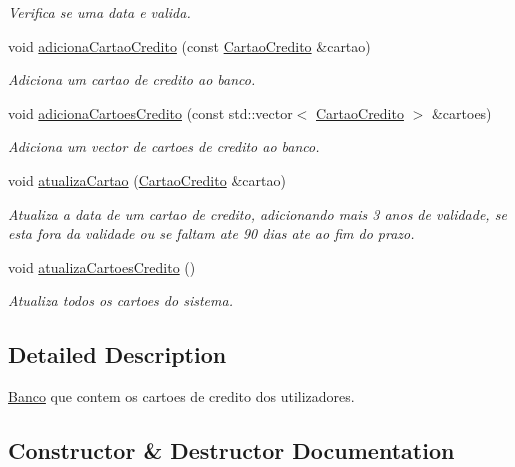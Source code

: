 \begin{DoxyCompactItemize}
\begin{DoxyCompactList}\small\item\em Verifica se uma data e valida. \end{DoxyCompactList}\item 
void \hyperlink{classBanco_a2ac1bb3c6a742743bcbb6dd0a312d74d}{adiciona\+Cartao\+Credito} (const \hyperlink{classCartaoCredito}{Cartao\+Credito} \&cartao)
\begin{DoxyCompactList}\small\item\em Adiciona um cartao de credito ao banco. \end{DoxyCompactList}\item 
void \hyperlink{classBanco_a5f36ab07909fc570d158a21e2e6398f5}{adiciona\+Cartoes\+Credito} (const std\+::vector$<$ \hyperlink{classCartaoCredito}{Cartao\+Credito} $>$ \&cartoes)
\begin{DoxyCompactList}\small\item\em Adiciona um vector de cartoes de credito ao banco. \end{DoxyCompactList}\item 
void \hyperlink{classBanco_a8c8f743903ba86129b62afbb3813e6f0}{atualiza\+Cartao} (\hyperlink{classCartaoCredito}{Cartao\+Credito} \&cartao)
\begin{DoxyCompactList}\small\item\em Atualiza a data de um cartao de credito, adicionando mais 3 anos de validade, se esta fora da validade ou se faltam ate 90 dias ate ao fim do prazo. \end{DoxyCompactList}\item 
void \hyperlink{classBanco_ad6f39d091c83361878bc5cfda534a49d}{atualiza\+Cartoes\+Credito} ()
\begin{DoxyCompactList}\small\item\em Atualiza todos os cartoes do sistema. \end{DoxyCompactList}\end{DoxyCompactItemize}


\subsection{Detailed Description}
\hyperlink{classBanco}{Banco} que contem os cartoes de credito dos utilizadores. 

\subsection{Constructor \& Destructor Documentation}
\mbox{\label{classBanco_a686e51b219dc175e432e91559298b259}} 
